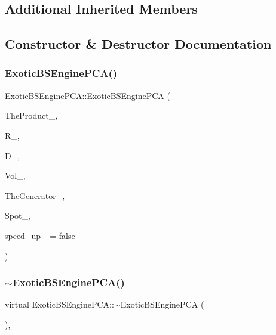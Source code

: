 \subsection*{Additional Inherited Members}


\subsection{Constructor \& Destructor Documentation}
\hypertarget{classExoticBSEnginePCA_ae91326f64b7a09fdf3d72383cad6dd8f}{}\label{classExoticBSEnginePCA_ae91326f64b7a09fdf3d72383cad6dd8f} 
\subsubsection{\texorpdfstring{Exotic\+B\+S\+Engine\+P\+C\+A()}{ExoticBSEnginePCA()}}
{\footnotesize\ttfamily Exotic\+B\+S\+Engine\+P\+C\+A\+::\+Exotic\+B\+S\+Engine\+P\+CA (\begin{DoxyParamCaption}\item[{const \hyperlink{classWrapper}{Wrapper}$<$ \hyperlink{classPathDependent}{Path\+Dependent} $>$ \&}]{The\+Product\+\_\+,  }\item[{const \hyperlink{classParameters}{Parameters} \&}]{R\+\_\+,  }\item[{const \hyperlink{classParameters}{Parameters} \&}]{D\+\_\+,  }\item[{const \hyperlink{classParameters}{Parameters} \&}]{Vol\+\_\+,  }\item[{const \hyperlink{classWrapper}{Wrapper}$<$ \hyperlink{classRandomBase}{Random\+Base} $>$ \&}]{The\+Generator\+\_\+,  }\item[{double}]{Spot\+\_\+,  }\item[{bool}]{speed\+\_\+up\+\_\+ = {\ttfamily false} }\end{DoxyParamCaption})}

\hypertarget{classExoticBSEnginePCA_a6bff4b8aa95aef41294fb707c78d8331}{}\label{classExoticBSEnginePCA_a6bff4b8aa95aef41294fb707c78d8331} 
\subsubsection{\texorpdfstring{$\sim$\+Exotic\+B\+S\+Engine\+P\+C\+A()}{~ExoticBSEnginePCA()}}
{\footnotesize\ttfamily virtual Exotic\+B\+S\+Engine\+P\+C\+A\+::$\sim$\+Exotic\+B\+S\+Engine\+P\+CA (\begin{DoxyParamCaption}{ }\end{DoxyParamCaption})\hspace{0.3cm}{\ttfamily [inline]}, {\ttfamily [virtual]}}




